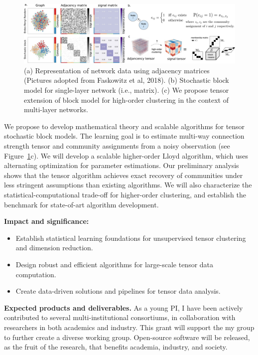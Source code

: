 \documentclass[11pt]{article}
\DeclareRobustCommand{\mybox}[2][gray!20]{%
\begin{tcolorbox}[   %
        breakable,
        left=0pt,
        right=0pt,
        top=0pt,
        bottom=0pt,
        colback=#1,
        colframe=#1,
        width=\dimexpr\textwidth\relax, 
        enlarge left by=0mm,
        boxsep=5pt,
        arc=0pt,outer arc=0pt,
        ]
        #2
\end{tcolorbox}
}
\theoremstyle{plain}
\theoremstyle{definition}
\begin{document}
\begin{figure}[H]
\vspace{-.2cm}
\begin{center}
\includegraphics[width=.9\textwidth]{network1.pdf}
\caption{(a) Representation of network data using adjacency matrices (Pictures adopted from Faskowitz et al, 2018). (b) Stochastic block model for single-layer network (i.e., matrix). (c) We propose tensor extension of block model for high-order clustering in the context of multi-layer networks.}\label{fig:1}
\end{center}
\vspace{-.6cm}
\end{figure}

We propose to develop mathematical theory and scalable algorithms for tensor stochastic block models. The learning goal is to estimate multi-way connection strength tensor and community assignments from a noisy observation (see Figure~\ref{fig:1}c). We will develop a scalable higher-order Lloyd algorithm, which uses alternating optimization for parameter estimations. Our preliminary analysis shows that the tensor algorithm achieves exact recovery of communities under less stringent assumptions than existing algorithms. We will also characterize the statistical-computational trade-off for higher-order clustering, and establish the benchmark for state-of-art algorithm development. 

\mybox[gray!20]{
{\bf Impact and significance:} 
\begin{itemize}[leftmargin=*]
\item Establish statistical learning foundations for unsupervised tensor clustering and dimension reduction. 
\item Design robust and efficient algorithms for large-scale tensor data computation. 
\item Create data-driven solutions and pipelines for tensor data analysis.
\end{itemize}
 }
 
{\bf Expected products and deliverables.} As a young PI, I have been actively contributed to several multi-institutional consortiums, in collaboration with researchers in both academics and industry. This grant will support the my group to further create a diverse working group. Open-source software will be released, as the fruit of the research, that benefits academia, industry, and society.
\end{document}
